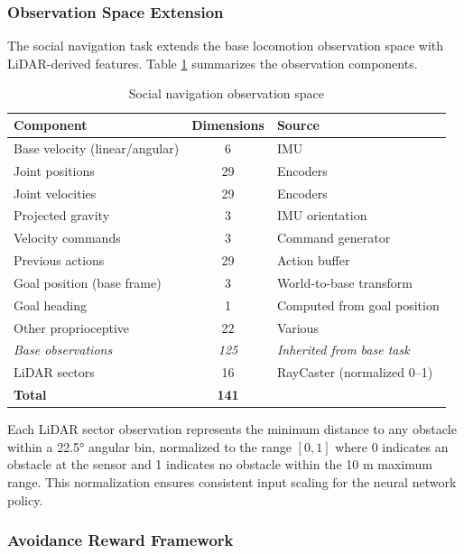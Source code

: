 \documentclass[12pt,a4paper]{article}
\begin{document}
\subsubsection{Observation Space Extension}

The social navigation task extends the base locomotion observation space with LiDAR-derived features. Table \ref{tab:social_nav_obs} summarizes the observation components.

\begin{table}[htbp]
\centering
\caption{Social navigation observation space}
\label{tab:social_nav_obs}
\begin{tabular}{lcl}
\toprule
\textbf{Component} & \textbf{Dimensions} & \textbf{Source} \\
\midrule
Base velocity (linear/angular) & 6 & IMU \\
Joint positions & 29 & Encoders \\
Joint velocities & 29 & Encoders \\
Projected gravity & 3 & IMU orientation \\
Velocity commands & 3 & Command generator \\
Previous actions & 29 & Action buffer \\
Goal position (base frame) & 3 & World-to-base transform \\
Goal heading & 1 & Computed from goal position \\
Other proprioceptive & 22 & Various \\
\midrule
\textit{Base observations} & \textit{125} & \textit{Inherited from base task} \\
\midrule
LiDAR sectors & 16 & RayCaster (normalized 0--1) \\
\midrule
\textbf{Total} & \textbf{141} & \\
\bottomrule
\end{tabular}
\end{table}

Each LiDAR sector observation represents the minimum distance to any obstacle within a 22.5° angular bin, normalized to the range $[0, 1]$ where 0 indicates an obstacle at the sensor and 1 indicates no obstacle within the 10 m maximum range. This normalization ensures consistent input scaling for the neural network policy.

\subsubsection{Avoidance Reward Framework}
\end{document}
